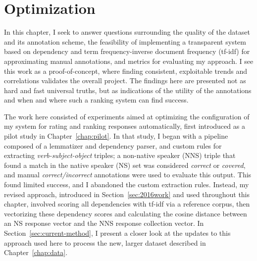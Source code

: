 \chapter{Optimization}
\label{chap:optimization}

In this chapter, I seek to answer questions surrounding the quality of the dataset and its annotation scheme, the feasibility of implementing a transparent system based on dependency and term frequency-inverse document frequency (tf-idf) for approximating manual annotations, and metrics for evaluating my approach. I see this work as a proof-of-concept, where finding consistent, exploitable trends and correlations validates the overall project. The findings here are presented not as hard and fast universal truths, but as indications of the utility of the annotations  and when and where such a ranking system can find success.

The work here consisted of experiments aimed at optimizing the configuration of my system for rating and ranking responses automatically, first introduced as a pilot study in Chapter~\ref{chap:pilot}. In that study, I began with a pipeline composed of a lemmatizer and dependency parser, and custom rules for extracting \textit{verb-subject-object} triples; a non-native speaker (NNS) triple that found a match in the native speaker (NS) set was considered \textit{correct} or \textit{covered}, and manual \textit{correct/incorrect} annotations were used to evaluate this output. This found limited success, and I abandoned the custom extraction rules. Instead, my revised approach, introduced in Section~\ref{sec:2016work} and used throughout this chapter, involved scoring all dependencies with tf-idf via a reference corpus, then vectorizing these dependency scores and calculating the cosine distance between an NS response vector and the NNS response collection vector. In Section~\ref{sec:current-method}, I present a closer look at the updates to this approach used here to process the new, larger dataset described in Chapter~\ref{chap:data}.

